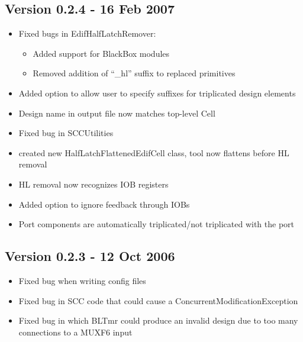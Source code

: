 \documentclass[english]{article}
\begin{document}
\subsection*{Version 0.2.4 - 16 Feb 2007}
\begin{itemize}
\item Fixed bugs in EdifHalfLatchRemover: 
\begin{itemize}
\item Added support for BlackBox modules
\item Removed addition of ``\_hl'' suffix to replaced primitives
\end{itemize}
\item Added option to allow user to specify suffixes for triplicated design
elements
\item Design name in output file now matches top-level Cell
\item Fixed bug in SCCUtilities
\item created new HalfLatchFlattenedEdifCell class, tool now flattens before HL
removal
\item HL removal now recognizes IOB registers
\item Added option to ignore feedback through IOBs
\item Port components are automatically triplicated/not triplicated with the port
\end{itemize}

\subsection*{Version 0.2.3 - 12 Oct 2006}
\begin{itemize}
\item Fixed bug when writing config files
\item Fixed bug in SCC code that could cause a ConcurrentModificationException
\item Fixed bug in which BLTmr could produce an invalid design due to too many
  connections to a MUXF6 input
\end{itemize}
\end{document}
